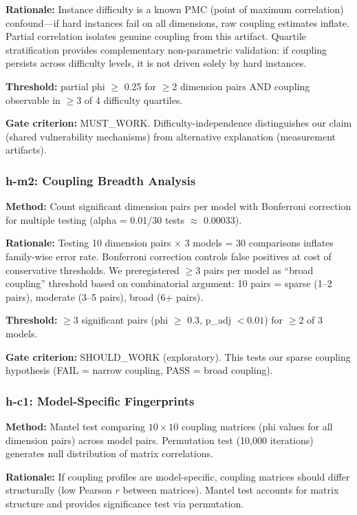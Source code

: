 \textbf{Rationale:} Instance difficulty is a known PMC (point of maximum correlation) confound---if hard instances fail on all dimensions, raw coupling estimates inflate. Partial correlation isolates genuine coupling from this artifact. Quartile stratification provides complementary non-parametric validation: if coupling persists across difficulty levels, it is not driven solely by hard instances.

\textbf{Threshold:} partial phi $\geq$ 0.25 for $\geq$2 dimension pairs AND coupling observable in $\geq$3 of 4 difficulty quartiles.

\textbf{Gate criterion:} MUST\_WORK. Difficulty-independence distinguishes our claim (shared vulnerability mechanisms) from alternative explanation (measurement artifacts).

\subsubsection{h-m2: Coupling Breadth Analysis}

\textbf{Method:} Count significant dimension pairs per model with Bonferroni correction for multiple testing (alpha = 0.01/30 tests $\approx$ 0.00033).

\textbf{Rationale:} Testing 10 dimension pairs $\times$ 3 models = 30 comparisons inflates family-wise error rate. Bonferroni correction controls false positives at cost of conservative thresholds. We preregistered $\geq$3 pairs per model as ``broad coupling'' threshold based on combinatorial argument: 10 pairs = sparse (1--2 pairs), moderate (3--5 pairs), broad (6+ pairs).

\textbf{Threshold:} $\geq$3 significant pairs (phi $\geq$ 0.3, p\_adj $< 0.01$) for $\geq$2 of 3 models.

\textbf{Gate criterion:} SHOULD\_WORK (exploratory). This tests our sparse coupling hypothesis (FAIL = narrow coupling, PASS = broad coupling).

\subsubsection{h-c1: Model-Specific Fingerprints}

\textbf{Method:} Mantel test comparing $10\times10$ coupling matrices (phi values for all dimension pairs) across model pairs. Permutation test (10,000 iterations) generates null distribution of matrix correlations.

\textbf{Rationale:} If coupling profiles are model-specific, coupling matrices should differ structurally (low Pearson $r$ between matrices). Mantel test accounts for matrix structure and provides significance test via permutation.

